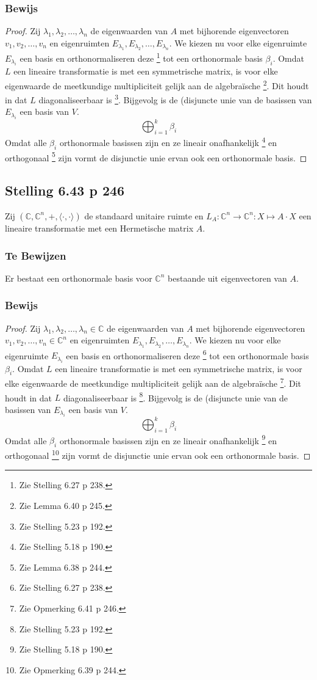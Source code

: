 \documentclass[lineaire_algebra_oplossingen.tex]{subfiles}
\begin{document}
\subsubsection*{Bewijs}
\begin{proof}
Zij $\lambda_1,\lambda_2,\ldots,\lambda_n$ de eigenwaarden van $A$ met bijhorende eigenvectoren $v_1,v_2,\ldots,v_n$ en eigenruimten $E_{\lambda_1},E_{\lambda_2},\ldots,E_{\lambda_n}$.
We kiezen nu voor elke eigenruimte $E_{\lambda_i}$ een basis en orthonormaliseren deze \footnote{Zie Stelling 6.27 p 238.} tot een orthonormale basis $\beta_i$.
Omdat $L$ een lineaire transformatie is met een symmetrische matrix, is voor elke eigenwaarde de meetkundige multipliciteit gelijk aan de algebra\"ische \footnote{Zie Lemma 6.40 p 245.}.
Dit houdt in dat $L$ diagonaliseerbaar is \footnote{Zie Stelling 5.23 p 192.}.
Bijgevolg is de (disjuncte unie van de basissen van $E_{\lambda_i}$ een basis van $V$.
\[
\bigoplus_{i=1}^k \beta_i
\]
Omdat alle $\beta_i$ orthonormale basissen zijn en ze lineair onafhankelijk \footnote{Zie Stelling 5.18 p 190.} en orthogonaal \footnote{Zie Lemma 6.38 p 244.} zijn vormt de disjunctie unie ervan ook een orthonormale basis.
\end{proof}


\subsection{Stelling 6.43 p 246}
\label{6.43}
Zij $(\mathbb{C},\mathbb{C}^n,+,\langle \cdot,\cdot \rangle)$ de standaard unitaire ruimte en $L_A: \mathbb{C}^n\rightarrow\mathbb{C}^n: X\mapsto A\cdot X$ een lineaire transformatie met een Hermetische matrix $A$.

\subsubsection*{Te Bewijzen}
Er bestaat een orthonormale basis voor $\mathbb{C}^n$ bestaande uit eigenvectoren van $A$.

\subsubsection*{Bewijs}
\begin{proof}
Zij $\lambda_1,\lambda_2,\ldots,\lambda_n \in \mathbb{C}$ de eigenwaarden van $A$ met bijhorende eigenvectoren $v_1,v_2,\ldots,v_n \in \mathbb{C}^n$ en eigenruimten $E_{\lambda_1},E_{\lambda_2},\ldots,E_{\lambda_n}$.
We kiezen nu voor elke eigenruimte $E_{\lambda_i}$ een basis en orthonormaliseren deze \footnote{Zie Stelling 6.27 p 238.} tot een orthonormale basis $\beta_i$.
Omdat $L$ een lineaire transformatie is met een symmetrische matrix, is voor elke eigenwaarde de meetkundige multipliciteit gelijk aan de algebra\"ische \footnote{Zie Opmerking 6.41 p 246.}.
Dit houdt in dat $L$ diagonaliseerbaar is \footnote{Zie Stelling 5.23 p 192.}.
Bijgevolg is de (disjuncte unie van de basissen van $E_{\lambda_i}$ een basis van $V$.
\[
\bigoplus_{i=1}^k \beta_i
\]
Omdat alle $\beta_i$ orthonormale basissen zijn en ze lineair onafhankelijk \footnote{Zie Stelling 5.18 p 190.} en orthogonaal \footnote{Zie Opmerking 6.39 p 244.} zijn vormt de disjunctie unie ervan ook een orthonormale basis.
\end{proof}
\end{document}

